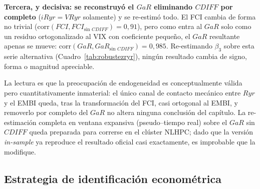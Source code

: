 \textbf{Tercera, y decisiva: se reconstruyó el $GaR$ eliminando $CDIFF$ por completo} ($iRyr=VRyr$ solamente) y se re-estimó todo. El FCI cambia de forma no trivial ($\mathrm{corr}(FCI,FCI_{\text{sin }CDIFF})=0{,}91$), pero como entra al $GaR$ solo como un residuo ortogonalizado al VIX con coeficiente pequeño, el $GaR$ resultante apenas se mueve: $\mathrm{corr}(GaR,GaR_{\text{sin }CDIFF})=0{,}985$. Re-estimando $\beta_3$ sobre esta serie alternativa (Cuadro~\ref{tab:robustezryr}), ningún resultado cambia de signo, forma o magnitud apreciable.

\begin{table}[t]
\centering\small
{}
\caption[Robustez de $\beta_3$ al GaR sin $CDIFF$]{$\beta_3=\mathrm{coef}(JLoss\times D)$ reestimado sobre el $GaR$ reconstruido sin el término tipo-\textit{spread}. Las columnas 3--4 usan la especificación de interacción de crisis de la Sección~\ref{sec:crisis-interaccion} (Backstop = GFC+COVID; EMstress = 2015--16). Fuente: \texttt{bbg/p9\_robustez\_gar\_nocdiff.py}; detalle en \texttt{NUMEROS\_CANONICOS\_BBG.md}.}
\label{tab:robustezryr}
\end{table}

La lectura es que la preocupación de endogeneidad es conceptualmente válida pero cuantitativamente inmaterial: el único canal de contacto mecánico entre $Ryr$ y el EMBI queda, tras la transformación del FCI, casi ortogonal al EMBI, y removerlo por completo del $GaR$ no altera ninguna conclusión del capítulo. La re-estimación completa en ventana expansiva (pseudo–tiempo real) sobre el $GaR$ sin $CDIFF$ queda preparada para correrse en el clúster NLHPC; dado que la versión \textit{in-sample} ya reproduce el resultado oficial casi exactamente, es improbable que la modifique.

\subsection{Estrategia de identificación econométrica}

